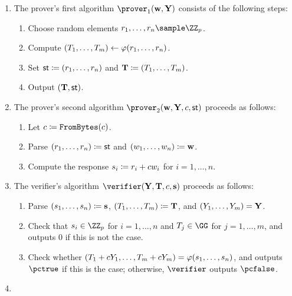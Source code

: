 \documentclass[runningheads,11pt]{article}
\begin{document}
\begin{enumerate}
  \item\label{item:basic:p1}
    The prover's first algorithm $\prover_1(\vec \witness,\vec \statement)$ consists of the following steps:
    \begin{enumerate}
      \item\label{item:basic:p1:randomness}
        Choose random elements $r_1,\dots,r_n\sample\ZZ_p$.
      \item
        Compute $(T_1,\dots,T_m)\gets\varphi(r_1,\dots,r_n)$.
      \item Set $\mathsf{st}\coloneqq (r_1,\dots,r_n)$ and $\mathbf {T}\coloneqq(T_1,\dots,T_m)$.
      \item
        Output $(\mathbf {T},\mathsf{st})$.
    \end{enumerate}
  \item\label{item:basic:p2}
    The prover's second algorithm $\prover_2(\vec \witness,\vec Y ,\challenge,\st)$ proceeds as follows:
    \begin{enumerate}
      \item
        Let $c \coloneqq \texttt{FromBytes}(c)$.
      \item Parse $(r_1,\dots,r_n)\coloneqq \mathsf{st}$ and $(w_1,\dots,w_n)\coloneqq \mathbf {w}$.
      \item Compute the response $s_i\coloneqq r_i+cw_i$ for $i=1,\dots,n$.
    \end{enumerate}
  \item\label{item:basic:v}
    The verifier's algorithm $\verifier(\vec \statement,\vec \commitment,\challenge,\vec \response)$ proceeds as follows:
    \begin{enumerate}
      \item Parse $(s_1, \dots, s_n) \coloneqq \mathbf {s}$, $(T_1, \dots, T_m) \coloneqq \mathbf {T}$, and $(Y_1, \dots, Y_m) = \mathbf {Y}$.
      \item\label{item:basic:v:checks}
        Check that $\response_i\in\ZZ_p$ for $i=1,\dots,n$ and $\commitment_j\in\GG$ for $j=1,\dots,m$, and outputs $0$ if this is not the case.
      \item Check whether $(T_1 + cY_1,\dots,T_m + cY_m) = \varphi(s_1,\dots,s_n)$, and outputs $\accept$ if this is the case; otherwise, $\verifier$ outputs $\reject$.
    \end{enumerate}
  \item\label{item:basic:sim}

\end{enumerate}
\end{document}
